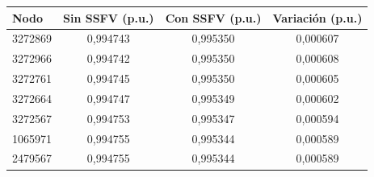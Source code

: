 \begin{tabular}{lccc}
\toprule
\textbf{Nodo} & \textbf{Sin SSFV (p.u.)} & \textbf{Con SSFV (p.u.)} & \textbf{Variación (p.u.)} \\
\midrule
3272869 & 0,994743 & 0,995350 & 0,000607 \\
3272966 & 0,994742 & 0,995350 & 0,000608 \\
3272761 & 0,994745 & 0,995350 & 0,000605 \\
3272664 & 0,994747 & 0,995349 & 0,000602 \\
3272567 & 0,994753 & 0,995347 & 0,000594 \\
1065971 & 0,994755 & 0,995344 & 0,000589 \\
2479567 & 0,994755 & 0,995344 & 0,000589 \\
\bottomrule
\end{tabular}
